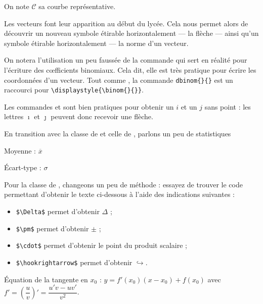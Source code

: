 \documentclass[10pt,french,openright,twoside]{book}
\begin{document}
{{\begin{SideBySideExample}
    On note $\mathcal C$ sa courbe repr\'esentative.
\end{SideBySideExample}
}\bigskip

Les vecteurs font leur apparition au début du lycée. Cela nous permet alors de découvrir un nouveau symbole étirable horizontalement --- la flèche --- ainsi qu'un symbole étirable horizontalement --- la norme d'un vecteur.


On notera l'utilisation un peu faussée de la commande  qui sert en réalité pour l'écriture des c{\oe}fficients binomiaux. Cela dit, elle est très pratique pour écrire les coordonnées d'un vecteur. Tout comme , la commande \verb!dbinom{}{}! est un raccourci pour \verb!\displaystyle{\binom{}{}}!.

\begin{info}
    Les commandes  et  sont bien pratiques pour obtenir un $i$ et un $j$ sans point : les lettres $\imath$ et $\jmath$ peuvent donc recevoir une flèche.
\end{info}

En transition avec la classe de  et celle de , parlons un peu de statistiques \bigskip

{\NewFont
\begin{SideBySideExample}
    Moyenne : $\overline{x}$\par
    \'Ecart-type : $\sigma$
\end{SideBySideExample}
}\bigskip

Pour la classe de , changeons un peu de méthode : essayez de trouver le code permettant d'obtenir le texte ci-dessous à l'aide des indications suivantes :
\begin{itemize}
    \item \verb!$\Delta$! permet d'obtenir $\Delta$ ;
    \item \verb!$\pm$! permet d'obtenir $\pm$ ;
    \item \verb!$\cdot$! permet d'obtenir le point du produit scalaire ;
    \item \verb!$\hookrightarrow$! permet d'obtenir $\hookrightarrow$.
\end{itemize}

\begin{CadreExemple}
\'Equation de la tangente en $x_0$ :
$y = f'(x_0) \left(x - x_0\right) + f(x_0)$ avec
$f' = \left(\dfrac u v\right)' = \dfrac{u'v - uv'}{v^2}$.\medskip


\end{CadreExemple}}
\end{document}
